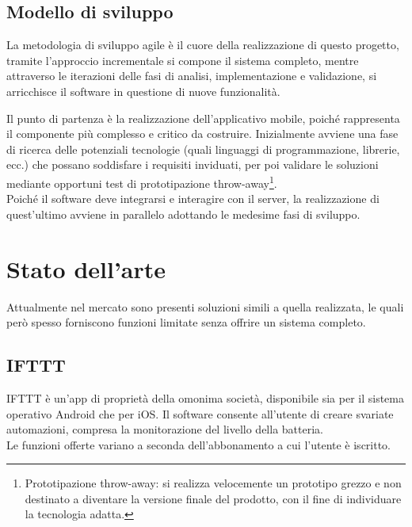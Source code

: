 \documentclass[target=bach]{thud}
\begin{document}
\section{Modello di sviluppo}

    La metodologia di sviluppo agile è il cuore della realizzazione di questo progetto, tramite l'approccio incrementale si compone il sistema completo, mentre attraverso le iterazioni delle fasi di analisi, implementazione e validazione, si arricchisce il software in questione di nuove funzionalità.

    Il punto di partenza è la realizzazione dell'applicativo mobile, poiché rappresenta il componente più complesso e critico da costruire. Inizialmente avviene una fase di ricerca delle potenziali tecnologie (quali linguaggi di programmazione, librerie, ecc.) che possano soddisfare i requisiti inviduati, per poi validare le soluzioni mediante opportuni test di prototipazione throw-away\footnote[1]{Prototipazione throw-away: si realizza velocemente un prototipo grezzo e non destinato a diventare la versione finale del prodotto, con il fine di individuare la tecnologia adatta.}.\\
    Poiché il software deve integrarsi e interagire con il server, la realizzazione di quest'ultimo avviene in parallelo adottando le medesime fasi di sviluppo.


\chapter{Stato dell'arte}

    Attualmente nel mercato sono presenti soluzioni simili a quella realizzata, le quali però spesso forniscono funzioni limitate senza offrire un sistema completo.

    \section{IFTTT}

    IFTTT è un'app di proprietà della omonima società, disponibile sia per il sistema operativo Android che per iOS.
    Il software consente all'utente di creare svariate automazioni, compresa la monitorazione del livello della batteria.\\
    Le funzioni offerte variano a seconda dell'abbonamento a cui l'utente è iscritto.
\end{document}

